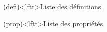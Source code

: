 \documentclass[../../main/main.tex]{subfiles}
\begin{document}
\vspace*{\fill}

%
\begin{boxes}
	\small
  \begin{isd}
      \begin{tcb}(defi)<lftt>{Liste des définitions}
    \end{tcb}
    \begin{tcb}(prop)<lftt>{Liste des propriétés}
    \end{tcb}

\end{isd}
\end{boxes}
\end{document}
